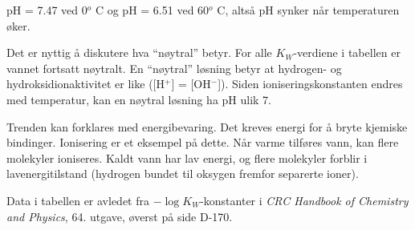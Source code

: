 





pH = 7.47 ved 0$^{o}$ C og pH = 6.51 ved 60$^{o}$ C, altså pH synker når temperaturen øker.

\vskip 10pt

Det er nyttig å diskutere hva ``nøytral'' betyr. For alle $K_W$-verdiene i tabellen er vannet fortsatt nøytralt. En ``nøytral'' løsning betyr at hydrogen- og hydroksidionaktivitet er like ([H$^{+}$] = [OH$^{-}$]). Siden ioniseringskonstanten endres med temperatur, kan en nøytral løsning ha pH ulik 7.

\vskip 10pt

Trenden kan forklares med energibevaring. Det kreves energi for å bryte kjemiske bindinger. Ionisering er et eksempel på dette. Når varme tilføres vann, kan flere molekyler ioniseres. Kaldt vann har lav energi, og flere molekyler forblir i lavenergitilstand (hydrogen bundet til oksygen fremfor separerte ioner).









Data i tabellen er avledet fra $- \log K_W$-konstanter i {\it CRC Handbook of Chemistry and Physics}, 64. utgave, øverst på side D-170.



